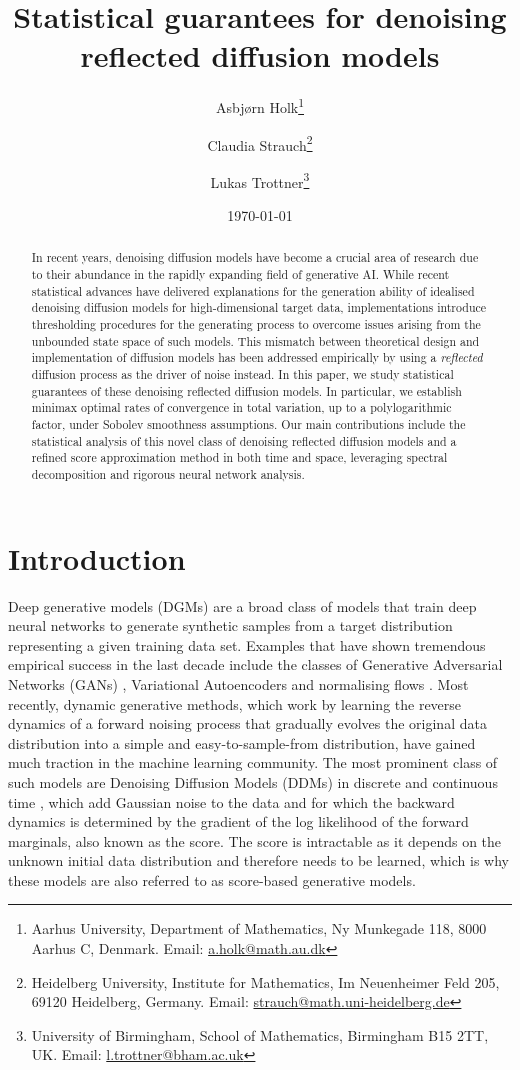 \documentclass[a4paper, 11pt, headings = small, abstract]{scrartcl}
\title{\fontsize{16}{19} \selectfont Statistical guarantees for denoising reflected diffusion models}
\author{Asbjørn Holk\thanks{Aarhus University, Department of Mathematics, Ny Munkegade 118, 8000 Aarhus C, Denmark. \newline Email: \href{mailto:a.holk@math.au.dk}{a.holk@math.au.dk}} \and Claudia Strauch\thanks{Heidelberg University, Institute for Mathematics, Im Neuenheimer Feld 205, 69120 Heidelberg, Germany. \newline Email: \href{mailto:strauch@math.uni-heidelberg.de}{strauch@math.uni-heidelberg.de}} \and Lukas Trottner\thanks{University of Birmingham, School of Mathematics, Birmingham B15 2TT, UK. \newline Email: \href{mailto:l.trottner@bham.ac.uk}{l.trottner@bham.ac.uk}}}
\date{\today}
\begin{document}
\maketitle


\begin{abstract} 
In recent years, denoising diffusion models have become a crucial area of research due to their abundance in the rapidly expanding field of generative AI. While recent statistical advances have delivered explanations for the generation ability of idealised denoising diffusion models for high-dimensional target data, implementations introduce thresholding procedures for the generating process to overcome issues arising from the unbounded state space of such models. This mismatch between theoretical design and implementation of diffusion models has been addressed empirically by using a \emph{reflected} diffusion process as the driver of noise instead. In this paper, we study statistical guarantees of these denoising reflected diffusion models. In particular, we establish minimax optimal rates of convergence in total variation, up to a polylogarithmic factor, under Sobolev smoothness assumptions. Our main contributions include the statistical analysis of this novel class of denoising reflected diffusion models and a refined score approximation method in both time and space, leveraging spectral decomposition and rigorous neural network analysis.
\end{abstract}

\section{Introduction}\label{sec:intro}
Deep generative models (DGMs) are a broad class of models that train deep neural networks to generate synthetic samples from a target distribution representing a given training data set. Examples that have shown tremendous empirical success in the last decade include the classes of Generative Adversarial Networks (GANs) \cite{goodfellow14,nowo16,arjovsky17,zhao17}, Variational Autoencoders  \cite{kingma14} and normalising flows \cite{papa21,rezende15,tabak13}. Most recently, dynamic generative methods, which work by learning the reverse dynamics of a forward noising process that gradually evolves the original data distribution into a simple and easy-to-sample-from distribution, have gained much traction in the machine learning community. The most prominent class of such models are Denoising Diffusion Models (DDMs) in discrete and continuous time \cite{song19,ho20,song21,sohl-d15}, which add Gaussian noise to the data and for which the backward dynamics is determined by the gradient of the log likelihood of the forward marginals, also known as the score. The score is intractable as it depends on the unknown initial data distribution and therefore needs to be learned, which is why these models are also referred to as score-based generative models. 
\end{document}
